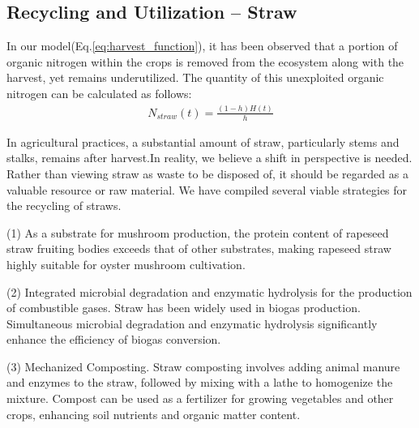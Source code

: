 \documentclass{mcmthesis}
\begin{document}
\subsection{Recycling and Utilization – Straw} 
\label{sec:crops_residue}
In our model(Eq.\ref{eq:harvest_function}), it has been observed that a portion of organic nitrogen within the crops is removed from the ecosystem along with the harvest, yet remains underutilized. The quantity of this unexploited organic nitrogen can be calculated as follows:
\begin{align}
    N_{straw}(t) = \frac{(1-h)H(t)}{h}
\end{align}

In agricultural practices, a substantial amount of straw, particularly stems and stalks, remains after harvest.In reality, we believe a shift in perspective is needed. Rather than viewing straw as waste to be disposed of, it should be regarded as a valuable resource or raw material. We have compiled several viable strategies for the recycling of straws.

(1) As a substrate for mushroom production, the protein content of rapeseed straw fruiting bodies exceeds that of other substrates, making rapeseed straw highly suitable for oyster mushroom cultivation\cite{mushroom}.

(2) Integrated microbial degradation and enzymatic hydrolysis for the production of combustible gases. Straw has been widely used in biogas production. Simultaneous microbial degradation and enzymatic hydrolysis significantly enhance the efficiency of biogas conversion.\cite{CH4}

(3) Mechanized Composting. Straw composting involves adding animal manure and enzymes to the straw, followed by mixing with a lathe to homogenize the mixture\cite{gummert2020sustainable}. Compost can be used as a fertilizer for growing vegetables and other crops, enhancing soil nutrients and organic matter content.
\end{document}
